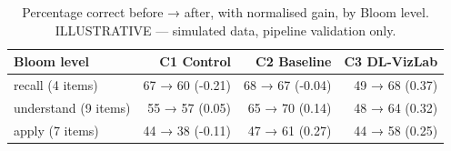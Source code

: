 \begin{table}[htbp]
\centering
\small
\caption{Percentage correct before → after, with normalised gain, by Bloom level. ILLUSTRATIVE — simulated data, pipeline validation only.}
\label{tab:T10}
\begin{tabular}{lrrr}
\toprule
Bloom level & C1 Control & C2 Baseline & C3 DL-VizLab \\
\midrule
recall (4 items) & 67 → 60 (-0.21) & 68 → 67 (-0.04) & 49 → 68 (0.37) \\
understand (9 items) & 55 → 57 (0.05) & 65 → 70 (0.14) & 48 → 64 (0.32) \\
apply (7 items) & 44 → 38 (-0.11) & 47 → 61 (0.27) & 44 → 58 (0.25) \\
\bottomrule
\end{tabular}
\end{table}
